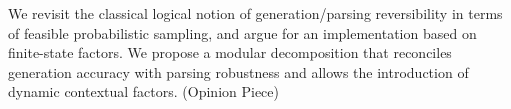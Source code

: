 We revisit the classical logical notion of generation/parsing reversibility in terms of feasible probabilistic sampling, and argue for an implementation based on finite-state factors. We propose a modular decomposition that reconciles generation accuracy with parsing robustness and allows the introduction of dynamic contextual factors. (Opinion Piece)
